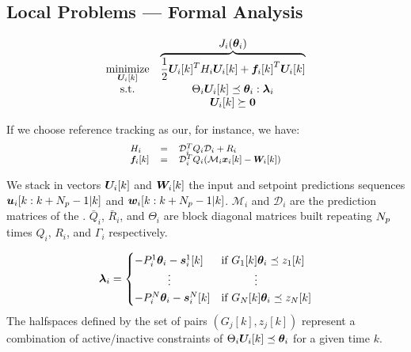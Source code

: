 \documentclass{ifacconf}  %
\begin{document}
\subsection{Local Problems --- Formal Analysis}\label{ssec:FA}

\begin{equation}
\begin{matrix}
\underset{\Uik}{\mathrm{minimize}}& \overbrace{\frac{1}{2} \Uik^T H_i\Uik+{\fik}^T\Uik}^{\textstyle J_{i}(\vec{\theta}_{i})}\\
\mathrm{s.t.}&\Theta_{i}\Uik\preceq\vec{\theta}_{i}:\vec{\lambda}_{i}\\
&\Uik\succeq\0
\end{matrix}
\label{eq:quadratic_case}
\end{equation}

If we choose reference tracking as our, for instance, we have:
\begin{equation}
\small\begin{matrix*}[l]
 H_i&=&\mathcal{D}_i^T\bar{Q}_i\mathcal{D}_i+\bar{R}_i\\
\fik&=&\mathcal{D}_i^T\bar{Q}_i(\mathcal{M}_i\xik-\Wik)\\

\end{matrix*}
\label{eq:matrices}
\end{equation}

We stack in vectors $\Uik$ and $\Wik$
the input and setpoint predictions sequences ${\uiseq}$ and ${\wiseq}$.
${\mathcal{M}_{i}}$  and ${\mathcal{D}_{i}}$ are the prediction matrices of the \mpc{}.
$\bar{Q}_{i}$, $\bar{R}_{i}$, and $\Theta_{i}$ are block diagonal matrices built repeating $N_{p}$ times $Q_{i}$, $R_{i}$, and $\Gamma_i$ respectively.

\begin{equation}
  \begin{aligned}
    \label{eq:lambdafuntheta}
    \lambdai=
    \begin{cases}
      -P_{i}^{1}\vec{\theta}_{i}-\vec{s}_{i}^{1}[k]&\text{if}\ G_{1}[k]\thetai \preceq z_{1}[k] \\
      \qquad\quad \vdots&\qquad\quad \vdots\\
      -P_{i}^{N}\vec{\theta}_{i}-\vec{s}_{i}^{N}[k]&\text{if}\ G_{N}[k]\thetai \preceq z_{N}[k] \\
    \end{cases}
  \end{aligned}
\end{equation}
The halfspaces defined by the set of pairs $(G_{j}[k],z_{j}[k])$ represent a combination of active/inactive constraints of $\Theta_{i}\Uik\preceq\vec{\theta}_{i}$ for a given time $k$.
\end{document}
